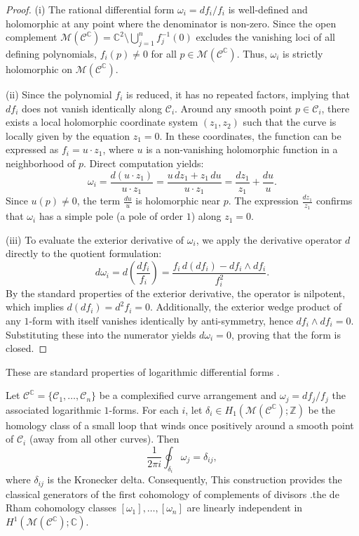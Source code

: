 \documentclass[article,11pt]{amsart} \numberwithin{equation}{section}
\numberwithin{equation}{section}
\begin{document}
{\begin{proof}
	(i) The rational differential form $\omega_i = df_i / f_i$ is well-defined and holomorphic at any point where the denominator is non-zero. Since the open complement $\mathcal{M}(\mathcal{C}^\mathbb{C}) = \mathbb{C}^2 \setminus \bigcup_{j=1}^n f_j^{-1}(0)$ excludes the vanishing loci of all defining polynomials, $f_i(p) \neq 0$ for all $p \in \mathcal{M}(\mathcal{C}^\mathbb{C})$. Thus, $\omega_i$ is strictly holomorphic on $\mathcal{M}(\mathcal{C}^\mathbb{C})$.
	
	(ii) Since the polynomial $f_i$ is reduced, it has no repeated factors, implying that $df_i$ does not vanish identically along $\mathscr{C}_i$. Around any smooth point $p \in \mathscr{C}_i$, there exists a local holomorphic coordinate system $(z_1, z_2)$ such that the curve is locally given by the equation $z_1 = 0$. In these coordinates, the function can be expressed as $f_i = u \cdot z_1$, where $u$ is a non-vanishing holomorphic function in a neighborhood of $p$. Direct computation yields:
	\[ \omega_i = \frac{d(u \cdot z_1)}{u \cdot z_1} = \frac{u \, dz_1 + z_1 \, du}{u \cdot z_1} = \frac{dz_1}{z_1} + \frac{du}{u}. \]
	Since $u(p) \neq 0$, the term $\frac{du}{u}$ is holomorphic near $p$. The expression $\frac{dz_1}{z_1}$ confirms that $\omega_i$ has a simple pole (a pole of order $1$) along $z_1 = 0$.
	
	(iii) To evaluate the exterior derivative of $\omega_i$, we apply the derivative operator $d$ directly to the quotient formulation:
	\[ d\omega_i = d\left(\frac{df_i}{f_i}\right) = \frac{f_i \, d(df_i) - df_i \wedge df_i}{f_i^2}. \]
	By the standard properties of the exterior derivative, the operator is nilpotent, which implies $d(df_i) = d^2 f_i = 0$. Additionally, the exterior wedge product of any $1$-form with itself vanishes identically by anti-symmetry, hence $df_i \wedge df_i = 0$. Substituting these into the numerator yields $d\omega_i = 0$, proving that the form is closed.
\end{proof}

These are standard properties of logarithmic differential forms
\cite{Saito80,GriffithsHarris,Voisin,Dupont2015}.

\begin{thm}\label{thm:log_independence}
	Let $\mathcal{C}^\mathbb{C} = \{\mathscr{C}_1,\dots,\mathscr{C}_n\}$ be a complexified curve arrangement and $\omega_j = df_j/f_j$ the associated logarithmic $1$-forms. For each $i$, let $\delta_i \in H_1(\mathcal{M}(\mathcal{C}^\mathbb{C});\mathbb{Z})$ be the homology class of a small loop that winds once positively around a smooth point of $\mathscr{C}_i$ (away from all other curves). Then
	\[
	\frac{1}{2\pi i} \oint_{\delta_i} \omega_j = \delta_{ij},
	\]
	where $\delta_{ij}$ is the Kronecker delta. Consequently, This construction provides the classical generators of the first cohomology of complements of divisors
	\cite{Arnold69,Libgober2001,CogolludoMatei2012}.the de Rham cohomology classes $[\omega_1],\dots,[\omega_n]$ are linearly independent in $H^1(\mathcal{M}(\mathcal{C}^\mathbb{C});\mathbb{C})$.
\end{thm}

}
\end{document}
